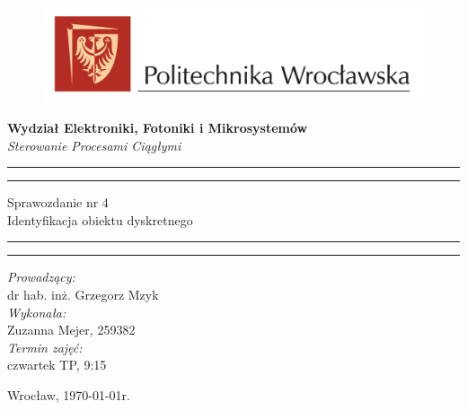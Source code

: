 \begin{titlepage}
\begin{figure}
    \centering
    \includegraphics[width=18cm]{../../logo-PWr.png}
    \label{fig:pwr}
\end{figure}
    \begin{center}
        \LARGE \textbf{ Wydział Elektroniki, Fotoniki i Mikrosystemów }\\ 
        \vspace{70pt}
        \Huge \textit{ Sterowanie Procesami Ciągłymi}  \\
    \end{center}
    \vspace{30pt}
    \hrule
    \vspace{1pt}
    \hrule
    \begin{center}
        {\fontsize{30}{50}\selectfont Sprawozdanie nr 4\\ }
        \vspace{10pt}
        {\fontsize{25}{25}\selectfont Identyfikacja obiektu dyskretnego }
    \end{center}
    \hrule
    \vspace{1pt}
    \hrule
    \begin{flushright}
        \vspace{50pt}

        \textit{\Large Prowadzący:}\\
        \Large dr hab. inż. Grzegorz Mzyk\\
        \vspace{10pt}
        \textit{\Large Wykonała:}\\
        \Large Zuzanna Mejer, 259382 \\
        \vspace{10pt}
        \textit{\Large Termin zajęć:}\\
        \Large czwartek TP, 9:15\\
        \vspace{10pt}
    
    \end{flushright}
    \vspace{60pt}
    \begin{center}
        \large Wrocław, \today r.
    \end{center}
\end{titlepage}
    
    